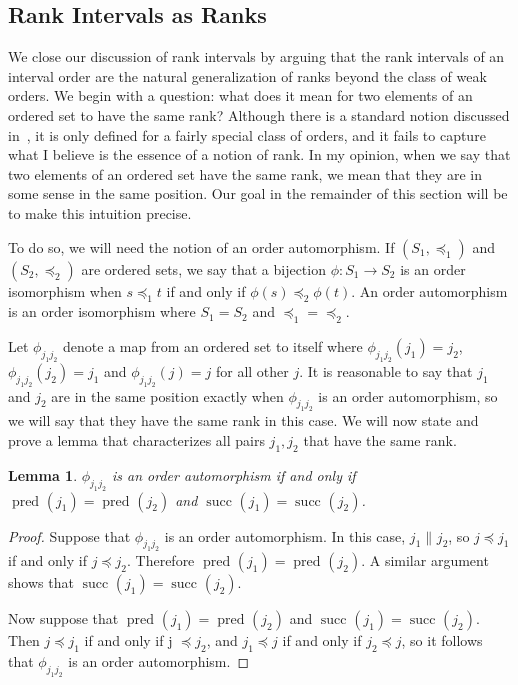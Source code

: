 \documentclass[12pt]{article}
\newcommand{\incomp}[1][]{\|_{#1}}
\newcommand{\pset}[2][]{\operatorname{pred}_{#1}(#2)}
\newcommand{\sset}[2][]{\operatorname{succ}_{#1}(#2)}
\numberwithin{theorem}{section}
\newtheorem{lemma}[theorem]{Lemma}
\begin{document}
\subsection{Rank Intervals as Ranks}
\label{subsec_rank_int_rank}

We close our discussion of rank intervals by arguing that the rank intervals of an interval order are the natural generalization of ranks beyond the class of weak orders.  We begin with a question: what does it mean for two elements of an ordered set to have the same rank?  Although there is a standard notion discussed in~\cite{stanley2011book}, it is only defined for a fairly special class of orders, and it fails to capture what I believe is the essence of a notion of rank.  In my opinion, when we say that two elements of an ordered set have the same rank, we mean that they are in some sense in the same position.  Our goal in the remainder of this section will be to make this intuition precise.

To do so, we will need the notion of an order automorphism.  If $(S_1, \preceq_1)$ and $(S_2, \preceq_2)$ are ordered sets, we say that a bijection $\phi : S_1 \rightarrow S_2$ is an order isomorphism when $s \preceq_1 t$ if and only if $\phi(s) \preceq_2 \phi(t)$.  An order automorphism is an order isomorphism where $S_1 = S_2$ and $\preceq_1 = \preceq_2$.

Let $\phi_{j_1j_2}$ denote a map from an ordered set to itself where $\phi_{j_1j_2}(j_1) = j_2$, $\phi_{j_1j_2}(j_2) = j_1$ and $\phi_{j_1j_2}(j) = j$ for all other $j$.  It is reasonable to say that $j_1$ and $j_2$ are in the same position exactly when $\phi_{j_1j_2}$ is an order automorphism, so we will say that they have the same rank in this case.  We will now state and prove a lemma that characterizes all pairs $j_1, j_2$ that have the same rank.

\begin{lemma}
\label{lem_aut}
$\phi_{j_1j_2}$ is an order automorphism if and only if $\pset{j_1} = \pset{j_2}$ and $\sset{j_1} = \sset{j_2}$.
\end{lemma}
\begin{proof}
Suppose that $\phi_{j_1j_2}$ is an order automorphism.  In this case, $j_1 \incomp j_2$, so $j \preceq j_1$ if and only if $j \preceq j_2$.  Therefore $\pset{j_1} = \pset{j_2}$.  A similar argument shows that $\sset{j_1} = \sset{j_2}$.

Now suppose that $\pset{j_1} = \pset{j_2}$ and $\sset{j_1} = \sset{j_2}$.  Then $j \preceq j_1$ if and only if j $\preceq j_2$, and $j_1 \preceq j$ if and only if $j_2 \preceq j$, so it follows that $\phi_{j_1j_2}$ is an order automorphism.
\end{proof}
\end{document}
